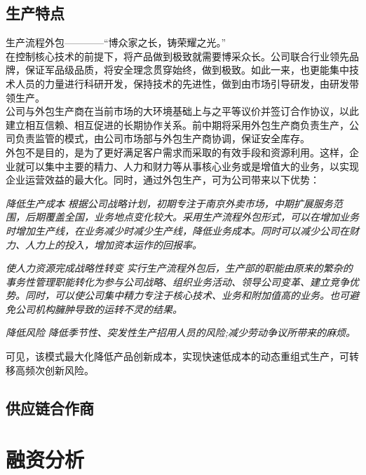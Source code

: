 \documentclass[violet]{main}
\begin{document}
		\section{生产特点}
			生产流程外包————“博众家之长，铸荣耀之光。”
			\\\indent 在控制核心技术的前提下，将产品做到极致就需要博采众长。公司联合行业领先品牌，保证军品级品质，将安全理念贯穿始终，做到极致。如此一来，也更能集中技术人员的力量进行科研开发，保持技术的先进性，做到由市场引导研发，由研发带领生产。
			\\\indent 公司与外包生产商在当前市场的大环境基础上与之平等议价并签订合作协议，以此建立相互信赖、相互促进的长期协作关系。前中期将采用外包生产商负责生产，公司负责监管的模式，由公司市场部与外包生产商协调，保证安全库存。
			\\\indent 外包不是目的，是为了更好满足客户需求而采取的有效手段和资源利用。这样，企业就可以集中主要的精力、人力和财力等从事核心业务或是增值大的业务，以实现企业运营效益的最大化。同时，通过外包生产，可为公司带来以下优势：
			\begin{strength3}{\it 降低生产成本}{}
				\it 根据公司战略计划，初期专注于南京外卖市场，中期扩展服务范围，后期覆盖全国，业务地点变化较大。采用生产流程外包形式，可以在增加业务时增加生产线，在业务减少时减少生产线，降低业务成本。同时可以减少公司在财力、人力上的投入，增加资本运作的回报率。
			\end{strength3}
			\begin{strength3}{\it 使人力资源完成战略性转变}{}
				\it 实行生产流程外包后，生产部的职能由原来的繁杂的事务性管理职能转化为参与公司战略、组织业务活动、领导公司变革、建立竞争优势。同时，可以使公司集中精力专注于核心技术、业务和附加值高的业务。也可避免公司机构臃肿导致的运转不灵的结果。
			\end{strength3}
			\begin{strength3}{\it 降低风险}{}
				\it 降低季节性、突发性生产招用人员的风险;减少劳动争议所带来的麻烦。
			\end{strength3}
			\par 可见，该模式最大化降低产品创新成本，实现快速低成本的动态重组式生产，可转移高频次创新风险。
		\section{供应链合作商}
	\chapter{融资分析}
\end{document}
